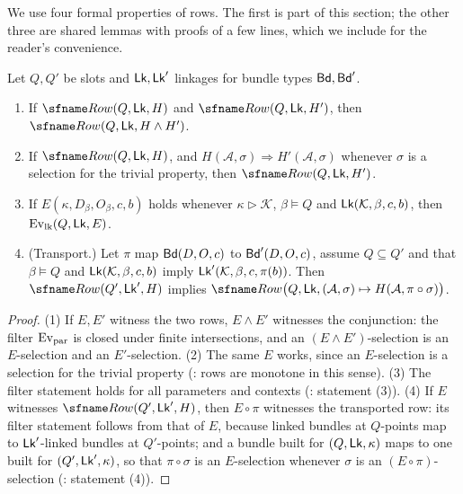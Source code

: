 We use four formal properties of rows. The first is part of this section; the other three are shared lemmas with
proofs of a few lines, which we include for the reader's convenience.

\begin{lemma}\label{pf:reckernel:calculus}
Let $Q,Q'$ be slots and $\mathsf{Lk},\mathsf{Lk}'$ linkages for bundle types $\mathsf{Bd},\mathsf{Bd}'$.
\begin{enumerate}
\item If $\reckRow(Q,\reckLk,H)$ and $\reckRow(Q,\reckLk,H')$, then $\reckRow(Q,\reckLk,H\wedge H')$.
\item If $\reckRow(Q,\reckLk,H)$, and $H(\mathcal A,\sigma)\Rightarrow H'(\mathcal A,\sigma)$ whenever $\sigma$ is a
  selection for the trivial property, then $\reckRow(Q,\reckLk,H')$.
\item If $E(\kappa,D_\beta,O_\beta,c,b)$ holds whenever $\kappa\rhd\mathcal K$, $\beta\models Q$ and $\mathsf{Lk}(\mathcal K,\beta,c,b)$, then
  $\mathrm{Ev}_{\mathrm{lk}}(Q,\mathsf{Lk},E)$.
\item \textup{(Transport.)} Let $\pi$ map $\mathsf{Bd}(D,O,c)$ to $\mathsf{Bd}'(D,O,c)$, assume $Q\subseteq Q'$ and that
  $\beta\models Q$ and $\mathsf{Lk}(\mathcal K,\beta,c,b)$ imply $\mathsf{Lk}'(\mathcal K,\beta,c,\pi(b))$. Then $\reckRow(Q',\reckLk',H)$
  implies $\reckRow\bigl(Q,\reckLk,(\mathcal A,\sigma)\mapsto H(\mathcal A,\pi\circ\sigma)\bigr)$.
\end{enumerate}
\end{lemma}

\begin{proof}
(1) If $E,E'$ witness the two rows, $E\wedge E'$ witnesses the conjunction: the filter $\mathrm{Ev}_{\mathrm{par}}$ is closed under
finite intersections, and an $(E\wedge E')$-selection is an $E$-selection and an $E'$-selection. (2) The same $E$
works, since an $E$-selection is a selection for the trivial property (: rows
are monotone in this sense). (3) The filter statement holds for all parameters and contexts
(: statement (3)). (4) If $E$ witnesses $\reckRow(Q',\reckLk',H)$, then
$E\circ\pi$ witnesses the transported row: its filter statement follows from that of $E$, because linked bundles at
$Q$-points map to $\mathsf{Lk}'$-linked bundles at $Q'$-points; and a bundle built for $(Q,\mathsf{Lk},\kappa)$ maps to one
built for $(Q',\mathsf{Lk}',\kappa)$, so that $\pi\circ\sigma$ is an $E$-selection whenever $\sigma$ is an
$(E\circ\pi)$-selection (: statement (4)).
\end{proof}

